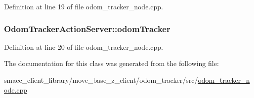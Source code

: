 Definition at line 19 of file odom\+\_\+tracker\+\_\+node.\+cpp.

\subsubsection[{\texorpdfstring{odom\+Tracker}{odomTracker}}]{ Odom\+Tracker\+Action\+Server\+::odom\+Tracker}\hypertarget{classOdomTrackerActionServer_a3e5c4328d3206fbd2fd2708f0aefe651}{}\label{classOdomTrackerActionServer_a3e5c4328d3206fbd2fd2708f0aefe651}


Definition at line 20 of file odom\+\_\+tracker\+\_\+node.\+cpp.



The documentation for this class was generated from the following file\+:\begin{DoxyCompactItemize}
\item 
smacc\+\_\+client\+\_\+library/move\+\_\+base\+\_\+z\+\_\+client/odom\+\_\+tracker/src/\hyperlink{odom__tracker__node_8cpp}{odom\+\_\+tracker\+\_\+node.\+cpp}\end{DoxyCompactItemize}
